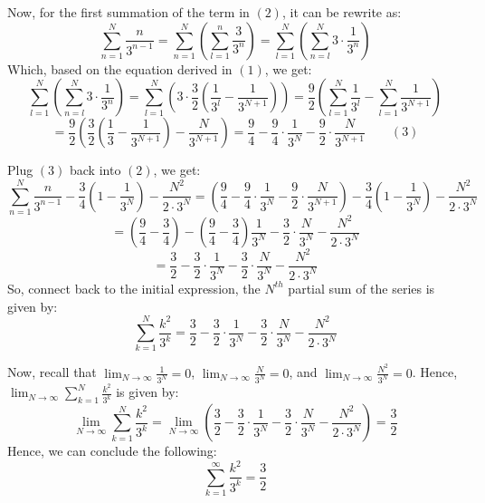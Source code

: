 \documentclass{article}
\begin{document}
\hfill

Now, for the first summation of the term in $(2)$, it can be rewrite as:
$$\sum_{n=1}^{N}\frac{n}{3^{n-1}} = \sum_{n=1}^{N}\left(\sum_{l=1}^{n}\frac{3}{3^{n}}\right) = \sum_{l=1}^{N}\left(\sum_{n=l}^{N}3\cdot \frac{1}{3^{n}}\right)$$
Which, based on the equation derived in $(1)$, we get:
$$\sum_{l=1}^{N}\left(\sum_{n=l}^{N}3\cdot \frac{1}{3^{n}}\right) = \sum_{l=1}^{N}\left(3\cdot \frac{3}{2}\left(\frac{1}{3^l}-\frac{1}{3^{N+1}}\right)\right) = \frac{9}{2}\left(\sum_{l=1}^{N}\frac{1}{3^l}-\sum_{l=1}^{N}\frac{1}{3^{N+1}}\right)$$
$$= \frac{9}{2}\left(\frac{3}{2}\left(\frac{1}{3}-\frac{1}{3^{N+1}}\right)-\frac{N}{3^{N+1}}\right) = \frac{9}{4}-\frac{9}{4}\cdot \frac{1}{3^N} - \frac{9}{2}\cdot\frac{N}{3^{N+1}}\quad\quad (3)$$

\hfill

Plug $(3)$ back into $(2)$, we get:
$$\sum_{n=1}^{N}\frac{n}{3^{n-1}} - \frac{3}{4}\left(1-\frac{1}{3^N}\right) - \frac{N^2}{2\cdot 3^N} = \left(\frac{9}{4}-\frac{9}{4}\cdot \frac{1}{3^N} - \frac{9}{2}\cdot\frac{N}{3^{N+1}}\right)- \frac{3}{4}\left(1-\frac{1}{3^N}\right) - \frac{N^2}{2\cdot 3^N}$$
$$ = \left(\frac{9}{4}-\frac{3}{4}\right) - \left(\frac{9}{4}-\frac{3}{4}\right)\frac{1}{3^N} - \frac{3}{2}\cdot \frac{N}{3^N}-\frac{N^2}{2\cdot 3^N}$$
$$ = \frac{3}{2} - \frac{3}{2}\cdot\frac{1}{3^N} - \frac{3}{2}\cdot \frac{N}{3^N}-\frac{N^2}{2\cdot 3^N}$$
So, connect back to the initial expression, the $N^{th}$ partial sum of the series is given by:
$$\sum_{k=1}^{N}\frac{k^2}{3^k} = \frac{3}{2} - \frac{3}{2}\cdot\frac{1}{3^N} - \frac{3}{2}\cdot \frac{N}{3^N}-\frac{N^2}{2\cdot 3^N}$$

\hfill

Now, recall that $\lim_{N\rightarrow\infty}\frac{1}{3^N}=0$, $\lim_{N\rightarrow\infty}\frac{N}{3^N}=0$, and $\lim_{N\rightarrow\infty}\frac{N^2}{3^N} = 0$. Hence, $\lim_{N\rightarrow\infty}\sum_{k=1}^{N}\frac{k^2}{3^k}$ is given by:
$$\lim_{N\rightarrow\infty}\sum_{k=1}^{N}\frac{k^2}{3^k} = \lim_{N\rightarrow\infty}\left(\frac{3}{2} - \frac{3}{2}\cdot\frac{1}{3^N} - \frac{3}{2}\cdot \frac{N}{3^N}-\frac{N^2}{2\cdot 3^N}\right) = \frac{3}{2}$$
Hence, we can conclude the following:
$$\sum_{k=1}^{\infty}\frac{k^2}{3^k}=\frac{3}{2}$$
\end{document}
